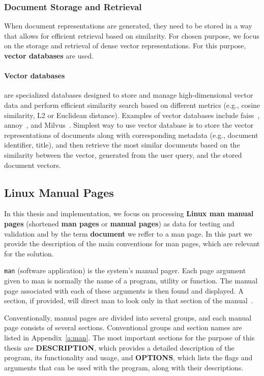 \subsubsection{Document Storage and Retrieval}

When document representations are generated, they need to be stored in a way
that allows for efficient retrieval based on similarity. For chosen purpose, we
focus on the storage and retrieval of dense vector representations. For this
purpose, \textbf{vector databases} are used.

\paragraph{Vector databases}\label{sec:vector-db} are specialized databases
designed to store and manage high-dimensional vector data and perform efficient
similarity search based on different metrics (e.g., cosine similarity, L2 or
Euclidean distance). Examples of vector databases include
\gls{faiss}~\cite{faiss2026}, \gls{annoy}~\cite{annoy2026}, and
Milvus~\cite{milvus2026}. Simplest way to use vector database is to store the
vector representations of documents along with corresponding metadata (e.g.,
document identifier, title), and then retrieve the most similar documents based
on the similarity between the vector, generated from the user query, and the
stored document vectors.



\subsection{Linux Manual Pages}

In this thesis and implementation, we focus on processing \textbf{Linux man
manual pages} (shortened \textbf{man pages} or \textbf{manual pages}) as data
for testing and validation and by the term \textbf{document} we reffer to a man
page. In this part we provide the description of the main conventions for man
pages, which are relevant for the solution.

\texttt{man} (software application) is the system's manual pager. Each page
argument given to man is normally the name of a program, utility or function.
The manual page associated with each of these arguments is then found and
displayed. A section, if provided, will direct man to look only in that section
of the manual~\cite{man_man}.

Conventionally, manual pages are divided into several groups, and each manual
page consists of several sections. Conventional groups and section names are
listed in Appendix~\ref{a:man}.
The most important sections for the purpose of this thesis are
\textbf{DESCRIPTION}, which provides a detailed description of the program, its
functionality and usage, and \textbf{OPTIONS}, which lists the flags and
arguments that can be used with the program, along with their descriptions.
